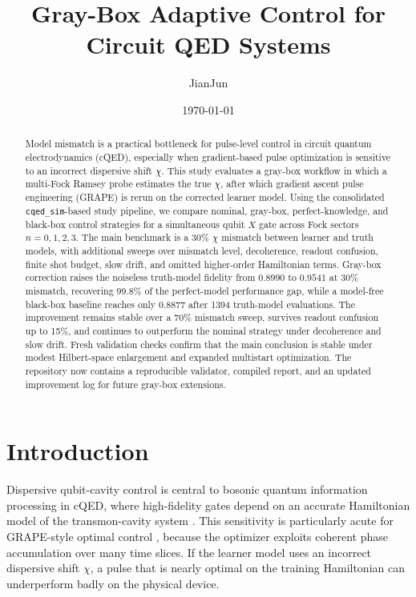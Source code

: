 \documentclass[aps,pra,twocolumn,reprint,amsmath,amssymb]{revtex4-2}
\begin{document}
\title{Gray-Box Adaptive Control for Circuit QED Systems}
\author{JianJun}
\date{\today}

\begin{abstract}
Model mismatch is a practical bottleneck for pulse-level control in circuit quantum
electrodynamics (cQED), especially when gradient-based pulse optimization is sensitive to an
incorrect dispersive shift $\chi$. This study evaluates a gray-box workflow in which a
multi-Fock Ramsey probe estimates the true $\chi$, after which gradient ascent pulse
engineering (GRAPE) is rerun on the corrected learner model. Using the consolidated
\texttt{cqed\_sim}-based study pipeline, we compare nominal, gray-box, perfect-knowledge, and
black-box control strategies for a simultaneous qubit $X$ gate across Fock sectors
$n=0,1,2,3$. The main benchmark is a 30\% $\chi$ mismatch between learner and truth models,
with additional sweeps over mismatch level, decoherence, readout confusion, finite shot
budget, slow drift, and omitted higher-order Hamiltonian terms. Gray-box correction raises
the noiseless truth-model fidelity from $0.8990$ to $0.9541$ at 30\% mismatch, recovering
99.8\% of the perfect-model performance gap, while a model-free black-box baseline reaches
only $0.8877$ after 1394 truth-model evaluations. The improvement remains stable over a
70\% mismatch sweep, survives readout confusion up to 15\%, and continues to outperform the
nominal strategy under decoherence and slow drift. Fresh validation checks confirm that the
main conclusion is stable under modest Hilbert-space enlargement and expanded multistart
optimization. The repository now contains a reproducible validator, compiled report, and an
updated improvement log for future gray-box extensions.
\end{abstract}

\maketitle

\section{Introduction}

Dispersive qubit-cavity control is central to bosonic quantum information processing in cQED,
where high-fidelity gates depend on an accurate Hamiltonian model of the transmon-cavity
system \cite{koch2007,blais2021}. This sensitivity is particularly acute for GRAPE-style
optimal control \cite{khaneja2005}, because the optimizer exploits coherent phase
accumulation over many time slices. If the learner model uses an incorrect dispersive shift
$\chi$, a pulse that is nearly optimal on the training Hamiltonian can underperform badly on
the physical device.
\end{document}
